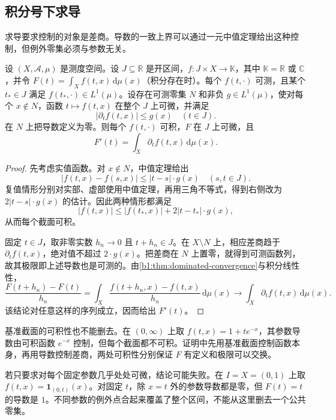 \subsection{积分号下求导}
\label{b1:subsec:050403}

求导要求控制的对象是差商。导数的一致上界可以通过一元中值定理给出这种控制，但例外零集必须与参数无关。

\begin{theorem}[积分号下求导]
\label{b1:thm:differentiation-under-integral}
设 \((X,\mathcal A,\mu)\) 是测度空间。设 \(J\subseteq\mathbb R\) 是开区间，\(f:J\times X\to\mathbb K\)，其中 \(\mathbb K=\mathbb R\) 或 \(\mathbb C\)，并令 \(F(t)=\int_Xf(t,x)\,\mathrm d\mu(x)\)（积分存在时）。每个 \(f(t,\cdot)\) 可测，且某个 \(t_*\in J\) 满足 \(f(t_*,\cdot)\in L^1(\mu)\)。设存在可测零集 \(N\) 和非负 \(g\in L^1(\mu)\)，使对每个 \(x\notin N\)，函数 \(t\mapsto f(t,x)\) 在整个 \(J\) 上可微，并满足
\[
|\partial_t f(t,x)|\leq g(x)\quad(t\in J).
\]
在 \(N\) 上把导数定义为零。则每个 \(f(t,\cdot)\) 可积，\(F\) 在 \(J\) 上可微，且
\[
F'(t)=\int_X\partial_t f(t,x)\,\mathrm d\mu(x).
\]
\end{theorem}
\begin{proof}
先考虑实值函数。对 \(x\notin N\)，中值定理给出
\[
|f(t,x)-f(s,x)|\leq |t-s|\cdot g(x)
\quad(s,t\in J).
\]
复值情形分别对实部、虚部使用中值定理，再用三角不等式，得到右侧改为 \(2|t-s|\cdot g(x)\) 的估计。因此两种情形都满足
\[
|f(t,x)|\leq |f(t_*,x)|+2|t-t_*|\cdot g(x),
\]
从而每个截面可积。

固定 \(t\in J\)，取非零实数 \(h_n\to0\) 且 \(t+h_n\in J\)。在 \(X\setminus N\) 上，相应差商趋于 \(\partial_t f(t,x)\)，绝对值不超过 \(2\cdot g(x)\)。把差商在 \(N\) 上置零，就得到可测函数列，故其极限即上述导数也是可测的。由\cref{b1:thm:dominated-convergence}与积分线性性，
\[
\dfrac{F(t+h_n)-F(t)}{h_n}
=\int_X\dfrac{f(t+h_n,x)-f(t,x)}{h_n}\,\mathrm d\mu(x)
\longrightarrow\int_X\partial_t f(t,x)\,\mathrm d\mu(x).
\]
该结论对任意这样的序列成立，因而给出 \(F'(t)\)。
\end{proof}

基准截面的可积性也不能删去。在 \((0,\infty)\) 上取 \(f(t,x)=1+te^{-x}\)，其参数导数由可积函数 \(e^{-x}\) 控制，但每个截面都不可积。证明中先用基准截面控制函数本身，再用导数控制差商，两处可积性分别保证 \(F\) 有定义和极限可以交换。

\ProseParagraphBreak

若只要求对每个固定参数几乎处处可微，结论可能失败。在 \(I=X=(0,1)\) 上取 \(f(t,x)=\mathbf1_{(0,t)}(x)\)。对固定 \(t\)，除 \(x=t\) 外的参数导数都是零，但 \(F(t)=t\) 的导数是 \(1\)。不同参数的例外点合起来覆盖了整个区间，不能从这里删去一个公共零集。

